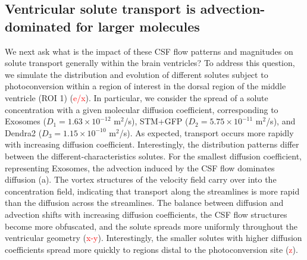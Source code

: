 \documentclass[fleqn]{wlscirep}
\newcommand{\fixme}[1]{\textcolor{red}{#1}}
\begin{document}
\subsection*{Ventricular solute transport is advection-dominated for larger molecules}
We next ask what is the impact of these CSF flow patterns and
magnitudes on solute transport generally within the brain ventricles?
To address this question, we simulate the distribution and evolution
of different solutes subject to photoconversion within a region of
interest in the dorsal region of the middle ventricle (ROI 1)
(\fixme{e/x}). In particular, we consider the spread of
a solute concentration with a given molecular diffusion coefficient,
corresponding to Exosomes ($D_1 = 1.63 \times 10^{-12}$ m$^2$/s),
STM+GFP ($D_2 = 5.75 \times 10^{-11}$ m$^2$/s), and Dendra2 ($D_3 =
1.15 \times 10^{-10}$ m$^2$/s). As expected, transport occurs more
rapidly with increasing diffusion coefficient. Interestingly, the
distribution patterns differ between the different-characteristics
solutes. For the smallest diffusion coefficient, representing
Exosomes, the advection induced by the CSF flow dominates diffusion
(a). The vortex structures of the velocity field
carry over into the concentration field, indicating that transport
along the streamlines is more rapid than the diffusion across the
streamlines. The balance between diffusion and advection shifts with
increasing diffusion coefficients, the CSF flow structures become more
obfuscated, and the solute spreads more uniformly throughout the
ventricular geometry (\fixme{x-y}). Interestingly, the
smaller solutes with higher diffusion coefficients spread more quickly
to regions distal to the photoconversion site (\fixme{z}).
\end{document}
